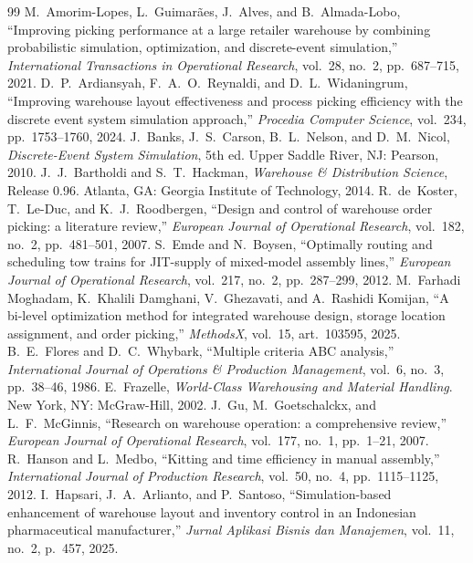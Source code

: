 \documentclass[12pt,a4paper]{article}
\begin{document}
\begin{thebibliography}{99}
 M.~Amorim-Lopes, L.~Guimar\~aes, J.~Alves, and B.~Almada-Lobo, ``Improving picking performance at a large retailer warehouse by combining probabilistic simulation, optimization, and discrete-event simulation,'' \textit{International Transactions in Operational Research}, vol.~28, no.~2, pp.~687--715, 2021.
 D.~P.~Ardiansyah, F.~A.~O.~Reynaldi, and D.~L.~Widaningrum, ``Improving warehouse layout effectiveness and process picking efficiency with the discrete event system simulation approach,'' \textit{Procedia Computer Science}, vol.~234, pp.~1753--1760, 2024.
 J.~Banks, J.~S.~Carson, B.~L.~Nelson, and D.~M.~Nicol, \textit{Discrete-Event System Simulation}, 5th ed. Upper Saddle River, NJ: Pearson, 2010.
 J.~J.~Bartholdi and S.~T.~Hackman, \textit{Warehouse \& Distribution Science}, Release 0.96. Atlanta, GA: Georgia Institute of Technology, 2014.
 R.~de~Koster, T.~Le-Duc, and K.~J.~Roodbergen, ``Design and control of warehouse order picking: a literature review,'' \textit{European Journal of Operational Research}, vol.~182, no.~2, pp.~481--501, 2007.
 S.~Emde and N.~Boysen, ``Optimally routing and scheduling tow trains for JIT-supply of mixed-model assembly lines,'' \textit{European Journal of Operational Research}, vol.~217, no.~2, pp.~287--299, 2012.
 M.~Farhadi Moghadam, K.~Khalili Damghani, V.~Ghezavati, and A.~Rashidi Komijan, ``A bi-level optimization method for integrated warehouse design, storage location assignment, and order picking,'' \textit{MethodsX}, vol.~15, art.~103595, 2025.
 B.~E.~Flores and D.~C.~Whybark, ``Multiple criteria ABC analysis,'' \textit{International Journal of Operations \& Production Management}, vol.~6, no.~3, pp.~38--46, 1986.
 E.~Frazelle, \textit{World-Class Warehousing and Material Handling}. New York, NY: McGraw-Hill, 2002.
 J.~Gu, M.~Goetschalckx, and L.~F.~McGinnis, ``Research on warehouse operation: a comprehensive review,'' \textit{European Journal of Operational Research}, vol.~177, no.~1, pp.~1--21, 2007.
 R.~Hanson and L.~Medbo, ``Kitting and time efficiency in manual assembly,'' \textit{International Journal of Production Research}, vol.~50, no.~4, pp.~1115--1125, 2012.
 I.~Hapsari, J.~A.~Arlianto, and P.~Santoso, ``Simulation-based enhancement of warehouse layout and inventory control in an Indonesian pharmaceutical manufacturer,'' \textit{Jurnal Aplikasi Bisnis dan Manajemen}, vol.~11, no.~2, p.~457, 2025.

\end{thebibliography}
\end{document}
